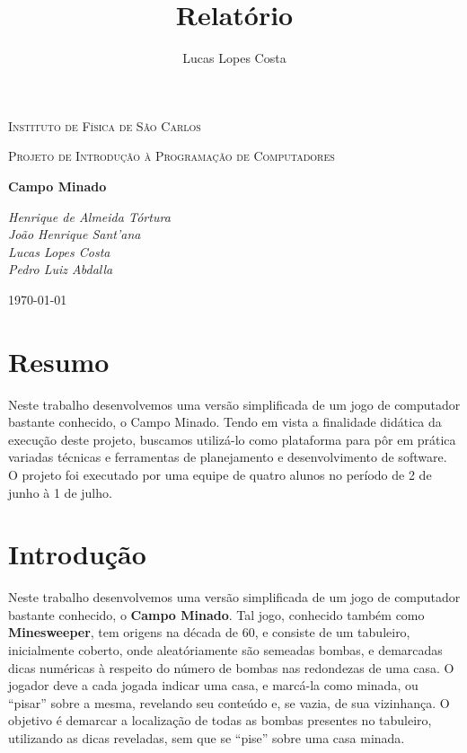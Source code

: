 \documentclass[10pt,a4paper]{report}
\author{Lucas Lopes Costa}
\title{Relatório}
\begin{document}
\begin{titlepage}
	\centering
	{\scshape\LARGE Instituto de Física de São Carlos \par}
	\vspace{1cm}
	{\scshape\Large Projeto de Introdução à Programação de Computadores\par}
	\vspace{1.5cm}
	{\huge\bfseries Campo Minado\par}
	\vspace{2cm}
	{\Large\itshape Henrique de Almeida Tórtura\\
João Henrique Sant'ana\\Lucas Lopes Costa\\Pedro Luiz Abdalla\par}

	\vfill

	{\large \today\par}
\end{titlepage}

\tableofcontents

\chapter{Resumo}

Neste trabalho desenvolvemos uma versão simplificada de um jogo de computador bastante conhecido, o Campo Minado. Tendo em vista a finalidade didática da execução deste projeto, buscamos utilizá-lo como plataforma para pôr em prática variadas técnicas e ferramentas de planejamento e desenvolvimento de software. O projeto foi executado por uma equipe de quatro alunos no período de 2 de junho à 1 de julho.

\chapter{Introdução}

Neste trabalho desenvolvemos uma versão simplificada de um jogo de computador bastante conhecido, o \textbf{Campo Minado}. Tal jogo, conhecido também como \textbf{Minesweeper}, tem origens na década de 60, e consiste de um tabuleiro, inicialmente coberto, onde aleatóriamente são semeadas bombas, e demarcadas dicas numéricas à respeito do número de bombas nas redondezas de uma casa. O jogador deve a cada jogada indicar uma casa, e marcá-la como minada, ou ``pisar'' sobre a mesma, revelando seu conteúdo e, se vazia, de sua vizinhança. O objetivo é demarcar a localização de todas as bombas presentes no tabuleiro, utilizando as dicas reveladas, sem que se ``pise'' sobre uma casa minada.
\end{document}
